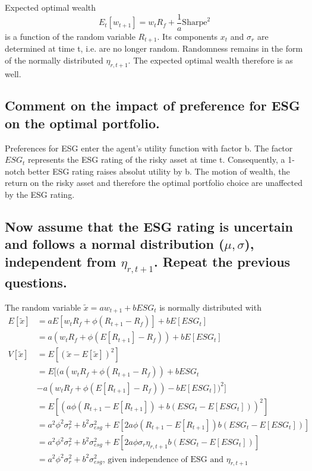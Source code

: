 \documentclass[]{article}
\begin{document}
Expected optimal wealth $$E_t[w_{t+1}] = w_t R_f + \frac{1}{a}\text{Sharpe}^2$$ is a function of the random variable $R_{t+1}$. Its components $x_t$ and $\sigma_r$ are determined at time t, i.e. are no longer random. Randomness remains in the form of the normally distributed $\eta_{r,t+1}$. The expected optimal wealth therefore is  as well.

\subsection{Comment on the impact of preference for ESG on the optimal portfolio.}
Preferences for ESG enter the agent's utility function with factor b. The factor $ESG_t$ represents the ESG rating of the risky asset at time t. Consequently, a 1-notch better ESG rating raises absolut utility by b. The motion of wealth, the return on the risky asset and therefore the optimal portfolio choice are unaffected by the ESG rating.

\subsection{Now assume that the ESG rating is uncertain and follows a normal distribution ($\mu, \sigma$), independent from $\eta_{r,t+1}$. Repeat the previous questions.}
The random variable $\tilde{x} = aw_{t+1} + bESG_t$ is normally distributed with 
\begin{align*}
	E[\tilde{x}] &= aE[w_t R_f + \phi (R_{t+1} - R_f)] + bE[ESG_t]\\
	&= a(w_t R_f + \phi (E[R_{t+1}] - R_f)) + bE[ESG_t]\\
	V[\tilde{x}] &= E[(\tilde{x} - E[\tilde{x}])^2]\\
	&= E[(a(w_t R_f + \phi (R_{t+1} - R_f)) + bESG_t \\
	&- a(w_t R_f + \phi (E[R_{t+1}] - R_f)) - bE[ESG_t])^2]\\
	&= E[(a\phi (R_{t+1} - E[R_{t+1}]) +b(ESG_t - E[ESG_t]))^2]\\
	&= a^2 \phi^2 \sigma_r^2 + b^2 \sigma_{esg}^2 + E[2 a\phi (R_{t+1} - E[R_{t+1}]) b(ESG_t - E[ESG_t])]\\
	&= a^2 \phi^2 \sigma_r^2 + b^2 \sigma_{esg}^2 + E[2 a\phi \sigma_r \eta_{r, t+1} b(ESG_t - E[ESG_t])]\\
	&= a^2 \phi^2 \sigma_r^2 + b^2 \sigma_{esg}^2 \text{, given independence of ESG and $\eta_{r, t+1}$}\\
\end{align*}
\end{document}
